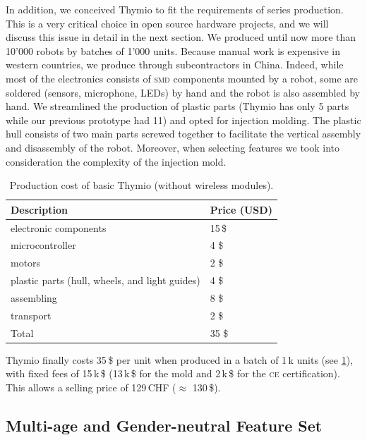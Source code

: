 \documentclass[letterpaper, 10 pt, conference]{ieeeconf}  %
\begin{document}
In addition, we conceived Thymio to fit the requirements of series production.
This is a very critical choice in open source hardware projects, and we will discuss this issue in detail in the next section.
We produced until now more than 10'000 robots by batches of 1'000 units.
Because manual work is expensive in western countries, we produce through subcontractors in China.
Indeed, while most of the electronics consists of \textsc{smd} components mounted by a robot, some are soldered (sensors, microphone, LEDs) by hand and the robot is also assembled by hand.
We streamlined the production of plastic parts (Thymio has only 5 parts while our previous prototype had 11) and opted for injection molding. 
The plastic hull consists of two main parts screwed together to facilitate the vertical assembly and disassembly of the robot.
Moreover, when selecting features we took into consideration the complexity of the injection mold.

\begin{table}
\centering
\begin{tabularx}{\columnwidth}{ll}
\toprule
Description & Price (USD)\\
\midrule
electronic components & 15\,\$ \\
microcontroller & 4 \$ \\
motors & 2 \$ \\
plastic parts (hull, wheels, and light guides) & 4 \$ \\
assembling & 8 \$ \\
transport & 2 \$ \\
\bottomrule
Total & 35 \$ \\
\end{tabularx}
\caption{Production cost of basic Thymio (without wireless modules).}
\label{tbl:thymio-price}
\end{table}

Thymio finally costs 35\,\$ per unit when produced in a batch of 1\,k units (see \ref{tbl:thymio-price}), with fixed fees of 15\,k\,\$ (13\,k\,\$ for the mold and 2\,k\,\$ for the \textsc{ce} certification).
This allows a selling price of 129\,CHF ($\approx$ 130\,\$).

\subsection{Multi-age and Gender-neutral Feature Set}
\end{document}
